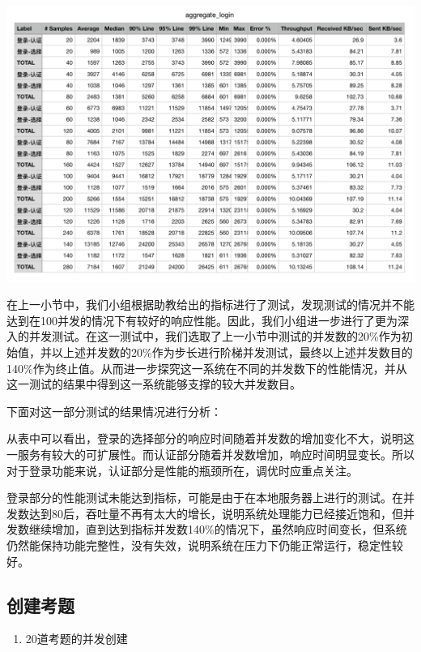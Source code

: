 \documentclass[hyperref, a4paper]{ctexart}
\providecommand{\tightlist}{%
  \setlength{\itemsep}{0pt}\setlength{\parskip}{0pt}}
\begin{document}
\includegraphics{resources/wcn/login_aggregate.png}

在上一小节中，我们小组根据助教给出的指标进行了测试，发现测试的情况并不能达到在100并发的情况下有较好的响应性能。因此，我们小组进一步进行了更为深入的并发测试。在这一测试中，我们选取了上一小节中测试的并发数的20\%作为初始值，并以上述并发数的20\%作为步长进行阶梯并发测试，最终以上述并发数目的140\%作为终止值。从而进一步探究这一系统在不同的并发数下的性能情况，并从这一测试的结果中得到这一系统能够支撑的较大并发数目。

下面对这一部分测试的结果情况进行分析：

从表中可以看出，登录的选择部分的响应时间随着并发数的增加变化不大，说明这一服务有较大的可扩展性。而认证部分随着并发数增加，响应时间明显变长。所以对于登录功能来说，认证部分是性能的瓶颈所在，调优时应重点关注。

登录部分的性能测试未能达到指标，可能是由于在本地服务器上进行的测试。在并发数达到80后，吞吐量不再有太大的增长，说明系统处理能力已经接近饱和，但并发数继续增加，直到达到指标并发数140\%的情况下，虽然响应时间变长，但系统仍然能保持功能完整性，没有失效，说明系统在压力下仍能正常运行，稳定性较好。

\hypertarget{ux521bux5efaux8003ux9898}{%
\subsection{创建考题}\label{ux521bux5efaux8003ux9898}}

\begin{enumerate}
\def\labelenumi{\arabic{enumi}.}
\tightlist
\item
  20道考题的并发创建
\end{enumerate}
\end{document}
